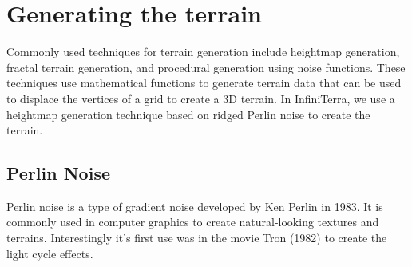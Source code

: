 \documentclass{report}
\begin{document}

\chapter{Generating the terrain}
\label{ch:generating-the-terrain}
Commonly used techniques for terrain generation include heightmap generation, fractal terrain
generation, and procedural generation using noise functions. These techniques use mathematical
functions to generate terrain data that can be used to displace the vertices of a grid to create a
3D terrain. In InfiniTerra, we use a heightmap generation technique based on ridged Perlin noise to
create the terrain.
\section{Perlin Noise}
Perlin noise is a type of gradient noise developed by Ken Perlin in 1983. It is commonly used in
computer graphics to create natural-looking textures and terrains. Interestingly it's first use was
in the movie Tron (1982) to create the light cycle effects.
\end{document}
